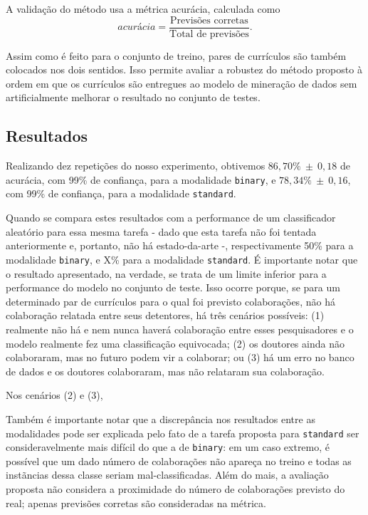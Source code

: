 \documentclass[12pt]{article}
\begin{document}
A validação do método usa a métrica acurácia, calculada como
\begin{equation}
  \textit{acurácia} = \frac{\text{Previsões corretas}}{\text{Total de previsões}}.
\end{equation}

Assim como é feito para o conjunto de treino, pares de currículos são também colocados nos dois sentidos.
Isso permite avaliar a robustez do método proposto à ordem em que os currículos são entregues ao modelo de mineração de dados sem artificialmente melhorar o resultado no conjunto de testes.

\subsection{Resultados}
\label{sec:results}
Realizando dez repetições do nosso experimento, obtivemos $86,70\%~\pm~0,18$ de acurácia, com 99\% de confiança, para a modalidade \texttt{binary}, e $78,34\%~\pm~0,16$, com 99\% de confiança, para a modalidade \texttt{standard}.

Quando se compara estes resultados com a performance de um classificador aleatório para essa mesma tarefa - dado que esta tarefa não foi tentada anteriormente e, portanto, não há estado-da-arte -, respectivamente 50\% para a modalidade \texttt{binary}, e X\% para a modalidade \texttt{standard}.
É importante notar que o resultado apresentado, na verdade, se trata de um limite inferior para a performance do modelo no conjunto de teste.
Isso ocorre porque, se para um determinado par de currículos para o qual foi previsto colaborações, não há colaboração relatada entre seus detentores, há três cenários possíveis: (1) realmente não há e nem nunca haverá colaboração entre esses pesquisadores e o modelo realmente fez uma classificação equivocada; (2) os doutores ainda não colaboraram, mas no futuro podem vir a colaborar; ou (3) há um erro no banco de dados e os doutores colaboraram, mas não relataram sua colaboração.

Nos cenários (2) e (3), 



Também é importante notar que a discrepância nos resultados entre as modalidades pode ser explicada pelo fato de a tarefa proposta para \texttt{standard} ser consideravelmente mais difícil do que a de \texttt{binary}: em um caso extremo, é possível que um dado número de colaborações não apareça no treino e todas as instãncias dessa classe seriam mal-classificadas.
Além do mais, a avaliação proposta não considera a proximidade do número de colaborações previsto do real; apenas previsões corretas são consideradas na métrica.
\end{document}
